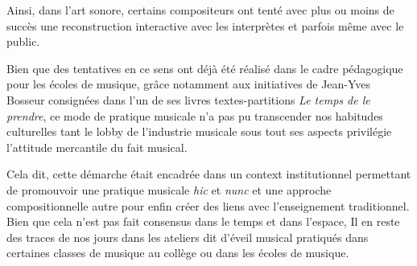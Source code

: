 \documentclass{article}
\begin{document}
Ainsi, dans l'art sonore, certains compositeurs ont tenté avec plus ou moins de succès une reconstruction interactive avec les interprètes et parfois même avec le public.

\bigskip{}
\bigskip

  
Bien que des tentatives en ce sens ont déjà été réalisé dans le cadre pédagogique pour les écoles de musique, grâce notamment aux initiatives de Jean-Yves Bosseur consignées dans l'un de ses livres textes-partitions \textit{Le temps de le prendre}, ce mode de pratique musicale n'a pas pu transcender nos habitudes culturelles tant le lobby de l'industrie musicale sous tout ses aspects privilégie l'attitude mercantile du fait musical. 


Cela dit, cette démarche était encadrée dans un context institutionnel permettant de promouvoir une pratique musicale \textit{hic}  et \textit{nunc} et une approche compositionnelle autre pour enfin créer des liens avec l'enseignement traditionnel. Bien que cela n'est pas fait consensus dans le temps et dans l'espace, Il en reste des traces de nos jours dans les ateliers dit d'éveil musical pratiqués dans certaines classes de musique au collège ou dans les écoles de musique. 

%

\bigskip


\bigskip\bigskip\bigskip
   [à reformuler...]
\end{document}
